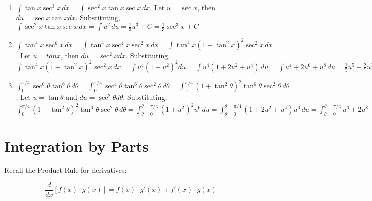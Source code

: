 \begin{Answer}[ref = power_3]
\begin{enumerate}
\item $\int \tan{x} \sec^3{x}\,dx = \int \sec^2{x} \tan{x} \sec{x}\,dx$. Let 
$u = \sec{x}$, then $du = \sec{x} \tan{x} dx$. Substituting, $\int \sec^2{x} 
\tan{x} \sec{x}\,dx = \int u^2\,du = \frac{1}{3}u^3 + C = \frac{1}{3}\sec^3{x} 
+ C$
\item $\int \tan^4{x} \sec^6{x}\,dx = \int \tan^4{x} \sec^4{x} \sec^2{x}\,dx = 
\int \tan^4{x} \left( 1 + \tan^2{x} \right)^2 \sec^2{x}\,dx$. Let $u = 
tan{x}$, then $du = \sec^2{x} dx$. Substituting, $\int \tan^4{x} \left( 1 + 
\tan^2{x} \right)^2 \sec^2{x}\,dx = \int u^4 \left( 1 + u^2 \right)^2 du = 
\int u^4 \left( 1 + 2u^2 + u^4 \right)\,du = \int u^4 + 2u^6 + u^8\,du = 
\frac{1}{5}u^5 + \frac{2}{7}u^7 + \frac{1}{9}u^9 + C = \frac{1}{5}\tan^5{x} + 
\frac{2}{7}\tan^7{x} + \frac{1}{9}\tan^9{x} + C$
\item $\int_0^{\pi/4} \sec^6{\theta} \tan^6{\theta}\,d\theta = \int_0^{\pi/4} 
\sec^4{\theta} \tan^6{\theta} \sec^2{\theta}\,d\theta = \int_0^{\pi/4} \left( 
1 + \tan^2{\theta} \right)^2 \tan^6{\theta} \sec^2{\theta}\,d\theta$. Let $u = 
\tan{\theta}$ and $du = \sec^2{\theta} d\theta$. Substituting, $\int_0^{\pi/4} 
\left( 1 + \tan^2{\theta} \right)^2 \tan^6{\theta} \sec^2{\theta}\,d\theta = 
\int_{\theta = 0}^{\theta = \pi/4} \left( 1 + u^2 \right)^2 u^6\,du = \int_{
\theta = 0}^{\theta = \pi/4} \left( 1 + 2u^2 + u^4 \right) u^6\,du = \int_{
\theta = 0}^{\theta = \pi/4} u^6 + 2u^8 + u^{10}\,du = \left[ \frac{1}{7}u^7 + 
\frac{2}{9}u^9 + \frac{1}{11}u^{11} \right]_{\theta = 0}^{\theta = \pi/4} = 
\left[ \frac{1}{7}\tan^7{\theta} + \frac{2}{9}\tan^9{\theta} + \frac{1}{11}
\tan^{11}{\theta} \right]_{\theta = 0}^{\theta = \pi/4} = \frac{1}{7}\left( 
1^7 - 0^7 \right) + \frac{2}{9} \left( 1^9 - 0^9 \right) + \frac{1}{11} \left( 
1^{11} - 0^{11} \right) = \frac{1}{7} + \frac{2}{9} + \frac{1}{11} = 
\frac{316}{693}$ 
\end{enumerate}
\end{Answer}

\section{Integration by Parts}

Recall the Product Rule for derivatives:

$$\frac{d}{dx} \left[ f(x) \cdot g(x) \right] = f(x) \cdot g'(x) + f'(x) \cdot g(x)$$

